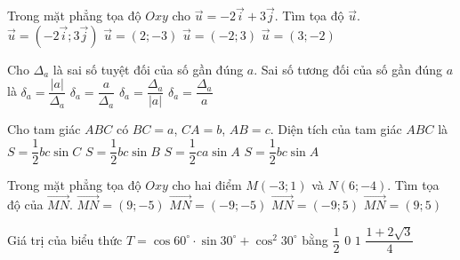 \begin{ex}%
Trong mặt phẳng tọa độ $Oxy$ cho $\vec{u}=-2\vec{i}+3\vec{j}$. Tìm tọa độ $\vec{u}$.
\choice
{$\vec{u}=\left(-2\vec{i};3\vec{j}\right)$}
{$\vec{u}=\left(2;-3\right)$}
{\True $\vec{u}=\left(-2;3\right)$}
{$\vec{u}=\left(3;-2\right)$}
\end{ex}

\begin{ex}%
Cho $\Delta_a$ là sai số tuyệt đối của số gần đúng $a$. Sai số tương đối của số gần đúng $a$ là
\choice
{$\delta_a=\dfrac{|a|}{\Delta_a}$}
{$\delta_a=\dfrac{a}{\Delta_a}$}
{\True $\delta_a=\dfrac{\Delta_a}{|a|}$}
{$\delta_a=\dfrac{\Delta_a}{a}$}
\end{ex}

\begin{ex}%
Cho tam giác $ABC$ có $BC=a$, $CA=b$, $AB=c$. Diện tích của tam giác $ABC$ là
\choice
{$S=\dfrac{1}{2}bc\sin C$}
{$S=\dfrac{1}{2}bc\sin B$}
{$S=\dfrac{1}{2}ca\sin A$}
{\True $S=\dfrac{1}{2}bc\sin A$}
\end{ex}

\begin{ex}%
Trong mặt phẳng tọa độ $Oxy$ cho hai điểm $M(-3;1)$ và $N(6;-4)$. Tìm tọa độ của $\vec{MN}$.
\choice
{\True $\vec{MN}=(9;-5)$}
{$\vec{MN}=(-9;-5)$}
{$\vec{MN}=(-9;5)$}
{$\vec{MN}=(9;5)$}
\end{ex}

\begin{ex}%
Giá trị của biểu thức $T=\cos 60^\circ\cdot \sin 30^\circ+\cos^2 30^\circ$ bằng
\choice
{$\dfrac{1}{2}$}
{$0$}
{\True $1$}
{$\dfrac{1+2\sqrt{3}}{4}$}
\end{ex}

